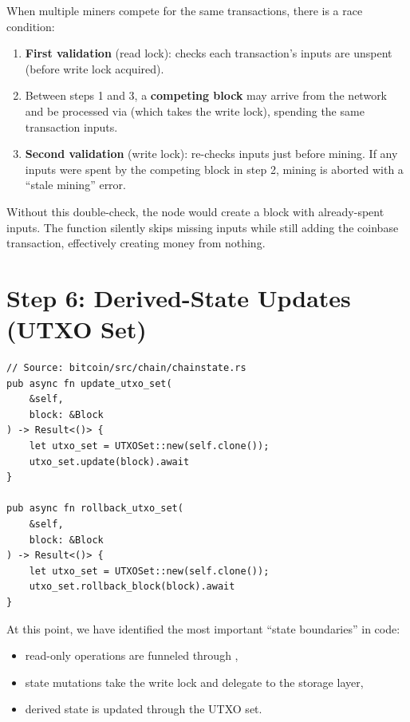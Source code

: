 \begin{warnbox}
When multiple miners compete for the same transactions, there is a race condition:

\begin{enumerate}
  \item \textbf{First validation} (read lock): checks each transaction's inputs are unspent (before write lock acquired).
  \item Between steps 1 and 3, a \textbf{competing block} may arrive from the network and be processed via  (which takes the write lock), spending the same transaction inputs.
  \item \textbf{Second validation} (write lock): re-checks inputs just before mining. If any inputs were spent by the competing block in step 2, mining is aborted with a ``stale mining'' error.
\end{enumerate}

Without this double-check, the node would create a block with already-spent inputs. The  function silently skips missing inputs while still adding the coinbase transaction, effectively creating money from nothing.
\end{warnbox}

\section{Step 6: Derived-State Updates (UTXO Set)}
\label{sec:ch09-2-step6}

\begin{listing}[H]
\caption{Derived-state delegation (UTXO update + rollback)}
\label{lst:ch09-2-6}
\begin{verbatim}
// Source: bitcoin/src/chain/chainstate.rs
pub async fn update_utxo_set(
    &self,
    block: &Block
) -> Result<()> {
    let utxo_set = UTXOSet::new(self.clone());
    utxo_set.update(block).await
}

pub async fn rollback_utxo_set(
    &self,
    block: &Block
) -> Result<()> {
    let utxo_set = UTXOSet::new(self.clone());
    utxo_set.rollback_block(block).await
}
\end{verbatim}
\end{listing}

At this point, we have identified the most important ``state boundaries'' in code:

\begin{itemize}
  \item read-only operations are funneled through ,
  \item state mutations take the write lock and delegate to the storage layer,
  \item derived state is updated through the UTXO set.
\end{itemize}


